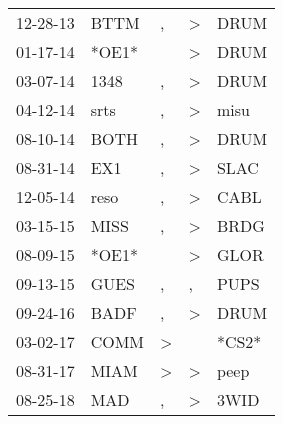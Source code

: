 \begin{supertabular}{lllll}
 12-28-13 &   BTTM &             , &  \textgreater &   DRUM \\
 01-17-14 &  *OE1* &               &  \textgreater &   DRUM \\
 03-07-14 &   1348 &             , &  \textgreater &   DRUM \\
 04-12-14 &   srts &             , &  \textgreater &   misu \\
 08-10-14 &   BOTH &             , &  \textgreater &   DRUM \\
 08-31-14 &    EX1 &             , &  \textgreater &   SLAC \\
 12-05-14 &   reso &             , &  \textgreater &   CABL \\
 03-15-15 &   MISS &             , &  \textgreater &   BRDG \\
 08-09-15 &  *OE1* &               &  \textgreater &   GLOR \\
 09-13-15 &   GUES &             , &             , &   PUPS \\
 09-24-16 &   BADF &             , &  \textgreater &   DRUM \\
 03-02-17 &   COMM &  \textgreater &               &  *CS2* \\
 08-31-17 &   MIAM &  \textgreater &  \textgreater &   peep \\
 08-25-18 &    MAD &             , &  \textgreater &   3WID \\
\end{supertabular}
